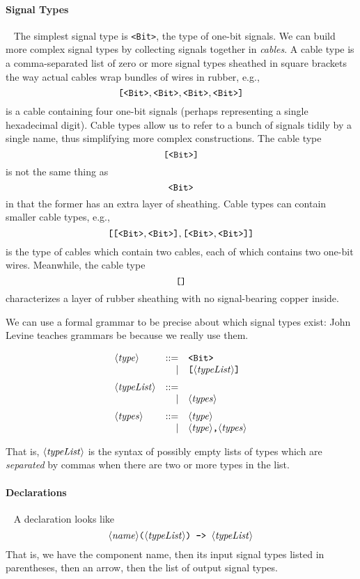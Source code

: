 \documentclass{article}
\begin{document}
\paragraph{Signal Types}~ The simplest signal type is \texttt{<Bit>},
the type of one-bit signals. We can build more complex signal types
by collecting signals together in \emph{cables}. A cable type is a
comma-separated list of zero or more signal types sheathed in square
brackets the way actual cables wrap bundles of wires in rubber, e.g.,
\[
  \texttt{[}\texttt{<Bit>},\texttt{<Bit>},\texttt{<Bit>},\texttt{<Bit>}\texttt{]}
\]
is a cable containing four one-bit signals (perhaps representing a
single hexadecimal digit). Cable types allow us to refer to a
bunch of signals tidily by a single name, thus simplifying more complex
constructions. The cable type
\[
  \texttt{[}\texttt{<Bit>}\texttt{]}
\]
is not the same thing as
\[
  \texttt{<Bit>}
\]
in that the former has an extra layer of sheathing. Cable types
can contain smaller cable types, e.g.,
\[
  \texttt{[}\texttt{[}\texttt{<Bit>},\texttt{<Bit>}\texttt{]},\texttt{[}\texttt{<Bit>},\texttt{<Bit>}\texttt{]}\texttt{]}
\]
is the type of cables which contain two cables, each of which contains
two one-bit wires. Meanwhile, the cable type
\[
  \texttt{[}\texttt{]}
\]
characterizes a layer of rubber sheathing with no signal-bearing
copper inside.

We can use a formal grammar to be precise about which signal types
exist: John Levine teaches grammars be because we really use them.

\[\begin{array}{lrl}
    \NT{type} & ::= & \Bit \\
              &   | & \cab{\NT{typeList}} \medskip\\
    \NT{typeList} & ::= & \\
              &   | & \NT{types}  \medskip\\
    \NT{types} & ::= & \NT{type} \\
               &   | & \NT{type}\texttt{,}\NT{types}
\end{array} \]

That is, $\langle\mathit{typeList}\rangle$ is the syntax of possibly empty lists
of types which are \emph{separated} by commas when there are two
or more types in the list.

\paragraph{Declarations}~ A declaration looks like
\[
  \langle\mathit{name}\rangle\texttt{(}\langle\mathit{typeList}\rangle\texttt{)}\texttt{~->~}\langle\mathit{typeList}\rangle
\]
That is, we have the component name, then its input signal types
listed in parentheses, then an arrow, then the list of output
signal types.
\end{document}
